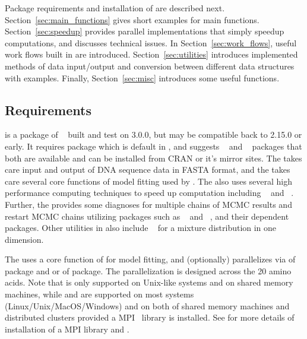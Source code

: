 Package requirements and installation of  are described
next. Section~\ref{sec:main_functions} gives short examples for
main functions.
Section~\ref{sec:speedup} provides parallel implementations that simply
speedup computations, and discusses technical issues.
In Section~\ref{sec:work_flows}, useful work flows
built in  are introduced.
Section~\ref{sec:utilities} introduces implemented methods of data
input/output and conversion between different data structures with examples.
Finally, Section~\ref{sec:misc} introduces some useful functions.


\subsection[Requirements]{Requirements}

 is a package of ~\citep{Rcore} built and test on
 3.0.0, but may be compatible back to 2.15.0 or early.
It requires  package which is default in , and
suggests ~\citep{seqinr} and ~\citep{VGAM}
packages that both are available and
can be installed from CRAN or it's mirror sites.
The  takes care input and output of DNA sequence data
in FASTA format, and the  takes care several core functions of
model fitting used by .
The  also uses several high performance computing
techniques to speed up computation including
~\citep{parallel} and
~\citep{Chen2012pbdMPIpackage}.
Further, the  provides some diagnoses for multiple chains of
MCMC results and restart MCMC chains utilizing packages such as
~\citep{doSNOW} and ~\citep{coda}, and
their dependent packages.
Other utilities in  also include
~\citep{EMCluster} for a mixture distribution in
one dimension.

The  uses a core function  of  for
model fitting, and (optionally) parallelizes
via  of  package and
 or  of  package.
The parallelization is designed across the 20 amino acids.
Note that  is only supported on Unix-like systems
and on shared memory machines, while  and
 are supported on most systems (Linux/Unix/MacOS/Windows)
and on both of shared memory machines and distributed clusters
provided a MPI~\citep{MPI1994} library is installed.
See \citet{Chen2012pbdMPIvignette} for more details of installation of a
MPI library and .



